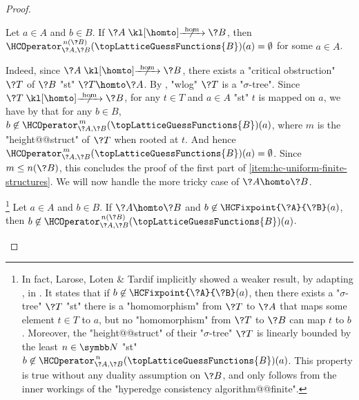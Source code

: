 \begin{proof}
	\begin{claim}%
		\AP\label{claim:hyperedge-consistency-uniform-convergence-no-hom}
		Let $a\in A$ and $b\in B$.
		If $\?A \nothomto \?B$, then $\HCOperator^{\,n(\?B)}_{\?A,\?B}(\topLatticeGuessFunctions{B})(a) = \emptyset$ for some $a \in A$.
	\end{claim}
	Indeed, since $\?A \nothomto \?B$, there exists a "critical obstruction" $\?T$ of $\?B$
	"st" $\?T \homto \?A$.
	By , "wlog" $\?T$ is a "$\sigma$-tree".
	Since $\?T \nothomto \?B$, for any $t \in T$ and $a\in A$
	"st" $t$ is mapped on $a$, we have by  that for any $b\in B$,
	$b \not\in \HCOperator^{\,m}_{\?A,\?B}(\topLatticeGuessFunctions{B})(a)$,
	where $m$ is the "height@@struct" of $\?T$ when rooted at $t$.
	And hence $\HCOperator^{\,m}_{\?A,\?B}(\topLatticeGuessFunctions{B})(a) = \emptyset$.
	Since $m \leq n(\?B)$, this concludes the proof of the first part of
	\eqref{item:hc-uniform-finite-structures}. We will now handle the more tricky case of
	$\?A \homto \?B$.
	
	\begin{claim}%
		\!\footnote{In fact, Larose, Loten \& Tardif implicitly showed a weaker result, by adapting
			\cite[Theorem 21]{FederVardi1998ComputationalStructure}, in
			\cite[Proof of Lemma 3.2]{LaroseLotenTardif2007CharacterisationFOCSP}.
			It states that
			if $b \not\in \HCFixpoint{\?A}{\?B}(a)$, then there
			exists a "$\sigma$-tree" $\?T$ "st" there is a "homomorphism" from $\?T$ to $\?A$
			that maps some element $t \in T$ to $a$, but no "homomorphism" from $\?T$ to $\?B$
			can map $t$ to $b$. Moreover, the "height@@struct" of their "$\sigma$-tree" $\?T$ is linearly 
			bounded by the least $n\in \N$ "st"
			$b\not\in \HCOperator^{\,n}_{\?A,\?B}(\topLatticeGuessFunctions{B})(a)$.
			This property is true without any duality assumption on $\?B$, and only follows
			from the inner workings of the "hyperedge consistency algorithm@@finite".}%
		\AP\label{claim:hyperedge-consistency-uniform-convergence-hom}
		Let $a\in A$ and $b\in B$.
		If $\?A \homto \?B$ and $b \not\in \HCFixpoint{\?A}{\?B}(a)$,
		then $b \not\in \HCOperator^{\,n(\?B)}_{\?A,\?B}(\topLatticeGuessFunctions{B})(a)$.
	\end{claim}


\end{proof}
